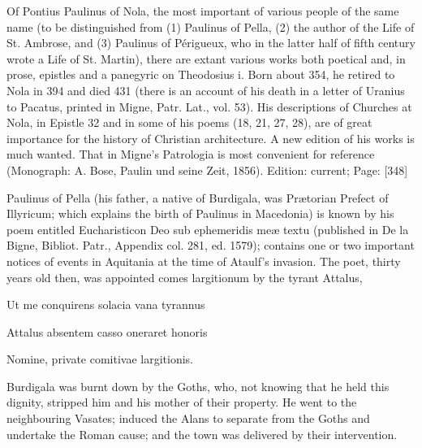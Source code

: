 Of Pontius Paulinus of Nola, the most important of various people of the same name (to be distinguished from (1) Paulinus of Pella, (2) the author of the Life of St. Ambrose, and (3) Paulinus of Périgueux, who in the latter half of fifth century wrote a Life of St. Martin), there are extant various works both poetical and, in prose, epistles and a panegyric on Theodosius i. Born about 354, he retired to Nola in 394 and died 431 (there is an account of his death in a letter of Uranius to Pacatus, printed in Migne, Patr. Lat., vol. 53). His descriptions of Churches at Nola, in Epistle 32 and in some of his poems (18, 21, 27, 28), are of great importance for the history of Christian architecture. A new edition of his works is much wanted. That in Migne\texthebrew{}’s Patrologia is most convenient for reference (Monograph: A. Bose, Paulin und seine Zeit, 1856).
Edition: current; Page: [348]

Paulinus of Pella (his father, a native of Burdigala, was Prætorian Prefect of Illyricum; which explains the birth of Paulinus in Macedonia) is known by his poem entitled Eucharisticon Deo sub ephemeridis meæ textu (published in De la Bigne, Bibliot. Patr., Appendix col. 281, ed. 1579); contains one or two important notices of events in Aquitania at the time of Ataulf\texthebrew{}’s invasion. The poet, thirty years old then, was appointed comes largitionum by the tyrant Attalus,

Ut me conquirens solacia vana tyrannus

Attalus absentem casso oneraret honoris

Nomine, private comitivae largitionis.

Burdigala was burnt down by the Goths, who, not knowing that he held this dignity, stripped him and his mother of their property. He went to the neighbouring Vasates; induced the Alans to separate from the Goths and undertake the Roman cause; and the town was delivered by their intervention.

